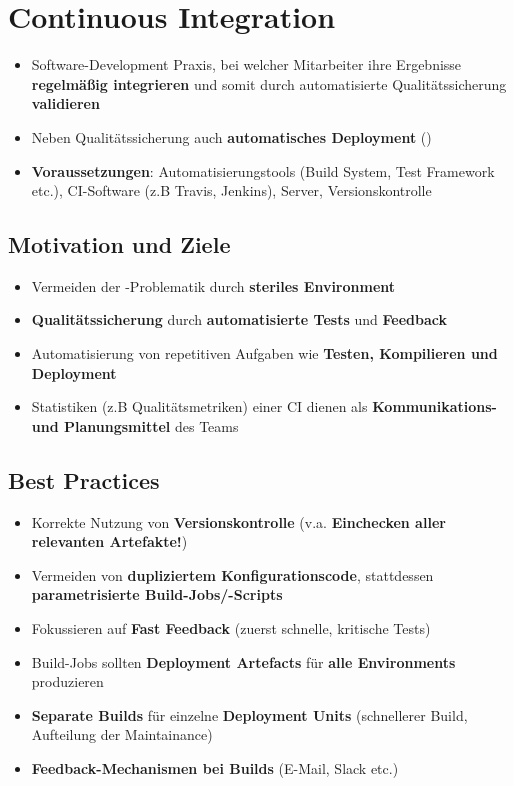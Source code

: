 \section{Continuous Integration}
\label{ci:sec:continuous_integration}

\begin{itemize}
	\item Software-Development Praxis, bei welcher Mitarbeiter ihre Ergebnisse \textbf{regelmäßig integrieren} und somit durch automatisierte Qualitätssicherung \textbf{validieren}
	\item Neben Qualitätssicherung auch \textbf{automatisches Deployment} ()
	\item \textbf{Voraussetzungen}: Automatisierungstools (Build System, Test Framework etc.), CI-Software (z.B Travis, Jenkins), Server, Versionskontrolle
\end{itemize}

\subsection{Motivation und Ziele}
\label{ci:sub:motivation_und_ziele}

\begin{itemize}
	\item Vermeiden der -Problematik durch \textbf{steriles Environment}
	\item \textbf{Qualitätssicherung} durch \textbf{automatisierte Tests} und \textbf{Feedback}
	\item Automatisierung von repetitiven Aufgaben wie \textbf{Testen, Kompilieren und Deployment}
	\item Statistiken (z.B Qualitätsmetriken) einer CI dienen als \textbf{Kommunikations- und Planungsmittel} des Teams
\end{itemize}

\subsection{Best Practices}
\label{ci:sub:best_practices}

\begin{itemize}
	\item Korrekte Nutzung von \textbf{Versionskontrolle} (v.a. \textbf{Einchecken aller relevanten Artefakte!})
	\item Vermeiden von \textbf{dupliziertem Konfigurationscode}, stattdessen \textbf{parametrisierte Build-Jobs/-Scripts}
	\item Fokussieren auf \textbf{Fast Feedback} (zuerst schnelle, kritische Tests)
	\item Build-Jobs sollten \textbf{Deployment Artefacts} für \textbf{alle Environments} produzieren
	\item \textbf{Separate Builds} für einzelne \textbf{Deployment Units} (schnellerer Build, Aufteilung der Maintainance)
	\item \textbf{Feedback-Mechanismen bei Builds} (E-Mail, Slack etc.)
\end{itemize}